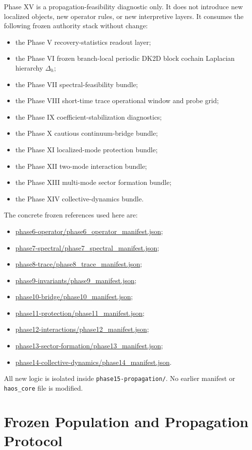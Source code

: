 \documentclass[11pt]{article}
\begin{document}
Phase XV is a propagation-feasibility diagnostic only. It does not introduce new localized objects, new operator rules, or new interpretive layers. It consumes the following frozen authority stack without change:
\begin{itemize}
\item the Phase V recovery-statistics readout layer;
\item the Phase VI frozen branch-local periodic DK2D block cochain Laplacian hierarchy $\Delta_h$;
\item the Phase VII spectral-feasibility bundle;
\item the Phase VIII short-time trace operational window and probe grid;
\item the Phase IX coefficient-stabilization diagnostics;
\item the Phase X cautious continuum-bridge bundle;
\item the Phase XI localized-mode protection bundle;
\item the Phase XII two-mode interaction bundle;
\item the Phase XIII multi-mode sector formation bundle;
\item the Phase XIV collective-dynamics bundle.
\end{itemize}

The concrete frozen references used here are:
\begin{itemize}
\item \url{phase6-operator/phase6_operator_manifest.json};
\item \url{phase7-spectral/phase7_spectral_manifest.json};
\item \url{phase8-trace/phase8_trace_manifest.json};
\item \url{phase9-invariants/phase9_manifest.json};
\item \url{phase10-bridge/phase10_manifest.json};
\item \url{phase11-protection/phase11_manifest.json};
\item \url{phase12-interactions/phase12_manifest.json};
\item \url{phase13-sector-formation/phase13_manifest.json};
\item \url{phase14-collective-dynamics/phase14_manifest.json}.
\end{itemize}

All new logic is isolated inside \texttt{phase15-propagation/}. No earlier manifest or \texttt{haos\_core} file is modified.

\section{Frozen Population and Propagation Protocol}
\end{document}
